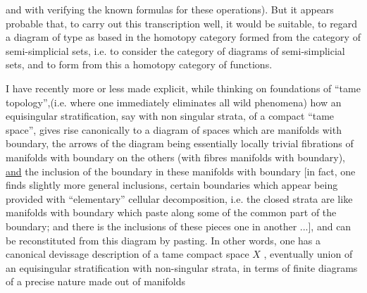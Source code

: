
and with verifying the known formulas for these operations).
But it appears probable that, to carry out this transcription well,
it would be suitable, to regard a diagram of type
\diagram{\begin{tikzcd}
  \cdot \ar[r]\ar[d] & {} \\
  {} &
\end{tikzcd}}
as based in the homotopy category formed from the category of
semi-simplicial sets, i.e. to consider the category of diagrams
of semi-simplicial sets, and to form from this a homotopy category
of functions.

I have recently more or less made explicit, while thinking
on  foundations of ``tame topology'',(i.e. where one immediately
eliminates all wild phenomena) how an equisingular stratification,
say with non singular strata, of a compact ``tame  space'', gives
rise canonically to a diagram of spaces which are manifolds with
boundary, the arrows of the diagram being essentially locally
trivial fibrations of manifolds with boundary on the others (with
fibres manifolds with boundary), \uline{and} the inclusion of the boundary
in these manifolds with boundary [in fact, one finds slightly
more general inclusions, certain boundaries which appear being
provided with ``elementary'' cellular decomposition, i.e. the
closed strata are like manifolds with boundary which paste along
some of the common part of the boundary; and there is
\hspace*{20em} the inclusions of these pieces
one in another ...], and can be reconstituted from this diagram
by pasting.  In other words, one has a canonical devissage
description of a tame compact space  $X$ , eventually union of an
equisingular stratification with non-singular strata, in terms
of finite diagrams of a precise nature made out of manifolds

